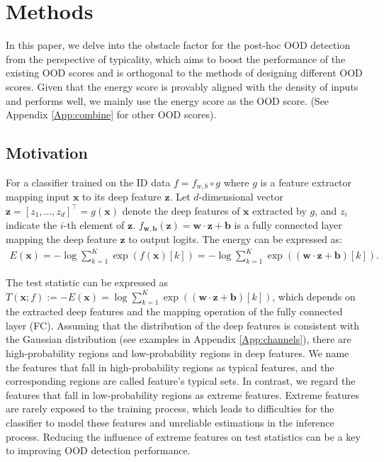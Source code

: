 \documentclass{article}
\newcommand{\benr}{\begin{eqnarray}}
\newcommand{\eenr}{\end{eqnarray}}
\def\rvx{{\mathbf{x}}}
\begin{document}
\section{Methods}

In this paper, we delve into the obstacle factor for the post-hoc OOD detection from the perspective of typicality, which aims to boost the performance of the existing OOD scores and is orthogonal to the methods of designing different OOD scores. Given that the energy score \cite{liu2020energy} is {provably} aligned with the density of inputs and performs well, we mainly use the energy score as the OOD score. (See Appendix \ref{App:combine} for other OOD scores).



\subsection{Motivation}

For a classifier trained on the ID data $f = f_{w, b} \circ g$ where $g$ is a feature extractor mapping input $\mathbf{x}$ to its deep feature $\mathbf{z}$.
Let $d$-dimensional vector $\mathbf{z} = [z_{1}, ...,z_{d}]^{\top} = g(\mathbf{x})$ denote the deep features of $\mathbf{x}$ extracted by $g$, and $z_{i}$ indicate the $i$-th element of $\mathbf{z}$. $f_{\mathbf{w},\mathbf{b}}(\mathbf{z}) = \mathbf{w} \cdot \mathbf{z} + \mathbf{b} $ is a fully connected layer mapping the deep feature $\mathbf{z}$ to output logits.
The energy can be expressed as:
\benr
E(\rvx) = -\log \sum_{k=1}^{K} \exp({f(\rvx)[k]})=-\log \sum_{k=1}^{K} \exp({( \mathbf{w} \cdot \mathbf{z} + \mathbf{b})[k]}).
\eenr

The test statistic can be expressed as $T(\rvx; f) := -E(\rvx)=\log \sum_{k=1}^{K} \exp({( \mathbf{w} \cdot \mathbf{z} + \mathbf{b})[k]})$, which depends on the extracted deep features and the mapping operation of the fully connected layer (FC). Assuming that the distribution of the deep features is consistent with the Gaussian distribution (see examples in Appendix \ref{App:channels}), there are high-probability regions and low-probability regions in deep features. We name the features that fall in high-probability regions as typical features, and the corresponding regions are called feature's typical sets. In contrast, we regard the features that fall in low-probability regions as extreme features. Extreme features are rarely exposed to the training process, which leads to difficulties for the classifier to model these features and unreliable estimations in the inference process. Reducing the influence of extreme features on test statistics can be a key to improving OOD detection performance.
\end{document}
